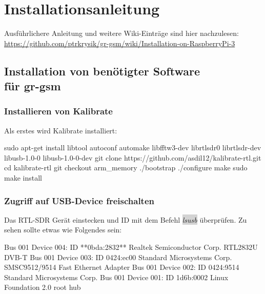 
\chapter{Installationsanleitung}\label{Install}

Ausführlichere Anleitung und weitere Wiki-Einträge sind hier nachzulesen:\\
\url{https://github.com/ptrkrysik/gr-gsm/wiki/Installation-on-RaspberryPi-3}


\section[Installation von benötigter Software für gr-gsm]{Installation von benötigter Software \\ für gr-gsm}

\subsection{Installieren von Kalibrate}

%
%

Als erstes wird Kalibrate installiert:

\begin{code}[	numbers=left,stepnumber=1]
sudo apt-get install libtool autoconf automake libfftw3-dev librtlsdr0 librtlsdr-dev libusb-1.0-0 libusb-1.0-0-dev
git clone https://github.com/asdil12/kalibrate-rtl.git
cd kalibrate-rtl
git checkout arm_memory
./bootstrap
./configure
make
sudo make install 
\end{code}

\subsection{Zugriff auf USB-Device freischalten}

Das RTL-SDR Gerät einstecken und ID mit dem Befehl \colorbox{lightgray}{\emph{lsusb}} überprüfen. Zu sehen sollte etwas wie Folgendes sein:

\begin{code}
Bus 001 Device 004: ID **0bda:2832** Realtek Semiconductor Corp. RTL2832U DVB-T
Bus 001 Device 003: ID 0424:ec00 Standard Microsystems Corp. SMSC9512/9514 Fast Ethernet Adapter
Bus 001 Device 002: ID 0424:9514 Standard Microsystems Corp.
Bus 001 Device 001: ID 1d6b:0002 Linux Foundation 2.0 root hub
\end{code}


